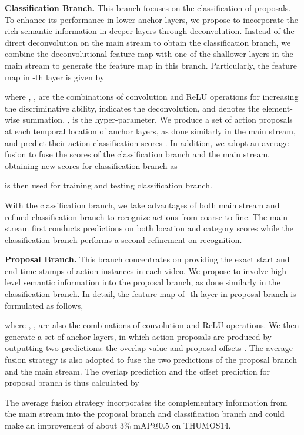\documentclass{article}
\begin{document}
\textbf{Classification Branch.}
This branch focuses on the classification of proposals. To enhance its performance in lower anchor layers, we propose to incorporate the rich semantic information in deeper layers through deconvolution.
Instead of the direct deconvolution on the main stream to obtain the classification branch, we combine the deconvolutional feature map with one of the shallower layers in the main stream to generate the feature map  in this branch.
Particularly, the feature map  in -th layer is given by 

where , ,  are the combinations of convolution and ReLU operations for increasing the discriminative ability,  indicates the deconvolution, and  denotes the element-wise summation, ,  is the hyper-parameter.
We produce a set of action proposals at each temporal location of anchor layers, as done similarly in the main stream, and predict their action classification scores .
In addition, we adopt an average fusion to fuse the scores of the classification branch and the main stream, obtaining new scores  for classification branch as

 is then used for training and testing classification branch.


With the classification branch, we take advantages of both main stream and refined classification branch to recognize actions from coarse to fine.
The main stream first conducts predictions on both location and category scores while the classification branch performs a second refinement on recognition. 


\textbf{Proposal Branch.}
This branch concentrates on providing the exact start and end time stamps of action instances in each video.
We propose to involve high-level semantic information into the proposal branch, as done similarly in the classification branch.
In detail, the feature map  of -th layer in proposal branch is formulated as follows,

where , ,  are also the combinations of convolution and ReLU operations.
We then generate a set of anchor layers, in which action proposals are produced by outputting two predictions: the overlap value  and proposal offsets .
The average fusion strategy is also adopted to fuse the two predictions
of the proposal branch and the main stream.
The overlap prediction  and the offset prediction  for proposal branch is thus calculated by

The average fusion strategy incorporates the complementary information from the main stream into the proposal branch and classification branch and could make an improvement of about 3\% mAP@0.5 on THUMOS14.
\end{document}
